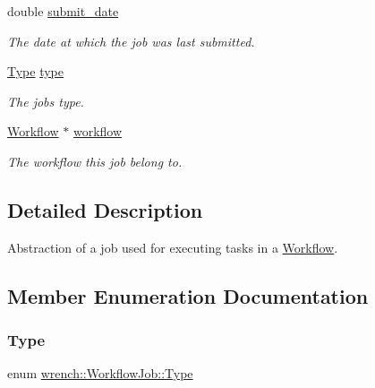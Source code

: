 \begin{DoxyCompactItemize}
double \hyperlink{classwrench_1_1_workflow_job_a0b3c7ad93f7a2515e7923370681f86d5}{submit\+\_\+date}
\begin{DoxyCompactList}\small\item\em The date at which the job was last submitted. \end{DoxyCompactList}\item 
\mbox{\label{classwrench_1_1_workflow_job_a03d2b65193a36b34e5451489b5b73737}} 
\hyperlink{classwrench_1_1_workflow_job_a5dcf81c50b5d221ef2a48126bf45d08b}{Type} \hyperlink{classwrench_1_1_workflow_job_a03d2b65193a36b34e5451489b5b73737}{type}
\begin{DoxyCompactList}\small\item\em The job\textquotesingle{}s type. \end{DoxyCompactList}\item 
\mbox{\label{classwrench_1_1_workflow_job_a18dad640a929bcb2ad6838c81a7dc3a8}} 
\hyperlink{classwrench_1_1_workflow}{Workflow} $\ast$ \hyperlink{classwrench_1_1_workflow_job_a18dad640a929bcb2ad6838c81a7dc3a8}{workflow}
\begin{DoxyCompactList}\small\item\em The workflow this job belong to. \end{DoxyCompactList}\end{DoxyCompactItemize}


\subsection{Detailed Description}
Abstraction of a job used for executing tasks in a \hyperlink{classwrench_1_1_workflow}{Workflow}. 

\subsection{Member Enumeration Documentation}
\mbox{\label{classwrench_1_1_workflow_job_a5dcf81c50b5d221ef2a48126bf45d08b}} 
\subsubsection{\texorpdfstring{Type}{Type}}
{\footnotesize\ttfamily enum \hyperlink{classwrench_1_1_workflow_job_a5dcf81c50b5d221ef2a48126bf45d08b}{wrench\+::\+Workflow\+Job\+::\+Type}}



